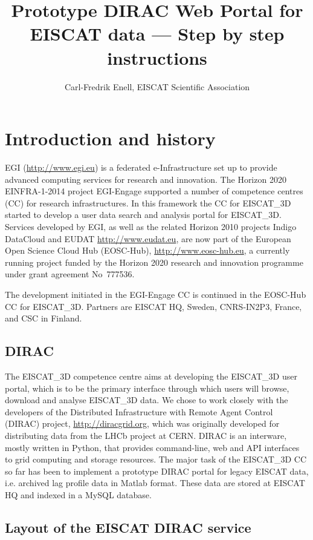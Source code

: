 \documentclass[a4paper]{article}
\title{Prototype DIRAC Web Portal for EISCAT data --- Step by step instructions}
\author{Carl-Fredrik Enell, EISCAT Scientific Association}
\newcommand{\etd}{EISCAT\_3D}
\begin{document}
\maketitle{}

\section{Introduction and history}
\label{sec:intro}

EGI (\url{http://www.egi.eu}) is a federated e-Infrastructure set up
to provide advanced computing services for research and innovation.
The Horizon 2020 EINFRA-1-2014 project EGI-Engage supported a number
of competence centres (CC) for research infrastructures. In this
framework the CC for \etd{} started to develop a user data search and
analysis portal for \etd{}. Services developed by EGI, as well as the
related Horizon 2010 projects Indigo DataCloud and EUDAT
\url{http://www.eudat.eu}, are now part of the European Open Science
Cloud Hub (EOSC-Hub), \url{http://www.eosc-hub.eu}, a currently
running project funded by the Horizon 2020 research and innovation
programme under grant agreement No~777536.

The development initiated in the EGI-Engage CC is continued in the EOSC-Hub CC for \etd{}. Partners are EISCAT HQ, Sweden, CNRS-IN2P3, France, and CSC in Finland.

\subsection{DIRAC}
\label{sec:dirac}
The \etd{} competence centre aims at developing the \etd{} user
portal, which is to be the primary interface through which users will
browse, download and analyse \etd{} data.  We chose to work closely
with the developers of the Distributed Infrastructure with Remote
Agent Control (DIRAC) project, \url{http://diracgrid.org}, which was
originally developed for distributing data from the LHCb project at
CERN. DIRAC is an interware, mostly written in Python, that provides
command-line, web and API interfaces to grid computing and storage
resources. The major task of the \etd{} CC so far has been to
implement a prototype DIRAC portal for legacy EISCAT data,
i.e. archived lag profile data in Matlab format. These data are stored
at EISCAT HQ and indexed in a MySQL database.

\subsection{Layout of the EISCAT DIRAC service}
\label{sec:eiscat-dirac}
\end{document}
